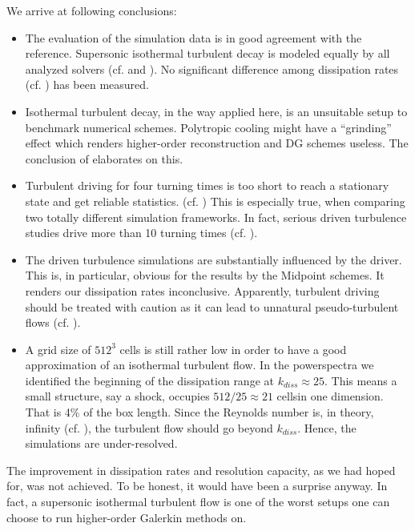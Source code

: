 We arrive at following conclusions:
\begin{itemize}
\item The evaluation of the simulation data is in good agreement with the
reference. Supersonic isothermal turbulent decay is modeled
equally by all analyzed solvers (cf.  and
). No significant difference among dissipation
rates (cf. ) has been measured.

\item Isothermal turbulent decay, in the way applied here, is an unsuitable
setup to benchmark numerical schemes. Polytropic cooling might have a
``grinding'' effect which renders higher-order reconstruction and DG schemes
useless. The conclusion of  elaborates on this.

\item Turbulent driving for four turning times is too short to reach a
stationary state and get reliable statistics. (cf.
) This is especially true, when
comparing two totally different simulation frameworks. In fact, serious driven
turbulence studies drive more than 10 turning times (cf. \cite{konstandin2016mach}).

\item The driven turbulence simulations are substantially influenced by the
driver. This is, in particular, obvious for the results by the Midpoint
schemes. It renders our dissipation rates inconclusive. Apparently, turbulent
driving should be treated with caution as it can lead to unnatural
pseudo-turbulent flows (cf. ).

\item A grid size of $512^3$ cells is still rather low in order to have a good
approximation of an isothermal turbulent flow. In the powerspectra we
identified the beginning of the dissipation range at $k_{diss} \approx 25$.
This means a small structure, say a shock, occupies $512/25 \approx 21$
cells\footnotemark in one dimension. That is 4\% of the box length. Since the
Reynolds number is, in theory, infinity (cf.  ), the turbulent
flow should go beyond $k_{diss}$.  Hence, the simulations are under-resolved.
\end{itemize}

The improvement in dissipation rates and resolution capacity, as we had hoped
for, was not achieved. To be honest, it would have been a surprise anyway. In
fact, a supersonic isothermal turbulent flow is one of the worst setups one can
choose to run higher-order Galerkin methods on. 

